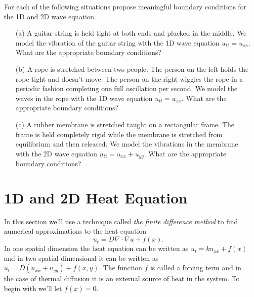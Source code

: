 \begin{problem}\label{prob:wave_bc}
   For each of the following situations propose meaningful boundary conditions for the 1D
   and 2D wave equation.
   \begin{enumerate}
       \item[(a)] A guitar string is held tight at both ends and plucked in the middle.
           We model the vibration of the guitar string with the 1D wave equation $u_{tt} =
           u_{xx}$.  What are the appropriate boundary conditions?
       \item[(b)] A rope is stretched between two people.  The person on the left holds
           the rope tight and doesn't move.  The person on the right wiggles the rope in a
           periodic fashion completing one full oscillation per second.  We model the
           waves in the rope with the 1D wave equation $u_{tt} = u_{xx}$.  What are the
           appropriate boundary conditions?
       \item[(c)] A rubber membrane is stretched taught on a rectangular frame.  The frame is
           held completely rigid while the membrane is stretched from equilibrium and then
           released.  We model the vibrations in the membrane with the 2D wave equation
           $u_{tt} = u_{xx} + u_{yy}$.  What are the appropriate boundary conditions?
   \end{enumerate}
\end{problem}


\newpage\section{1D and 2D Heat Equation}
In this section we'll use a technique called {\it the finite difference method} to find
numerical approximations to the heat equation
\[ u_t = D \nabla \cdot \nabla u + f(x). \]
In one spatial dimension the heat equation can be written as $u_t = ku_{xx} + f(x)$ and in
two spatial dimensional it can be written as $u_t = D \left( u_{xx} + u_{yy} \right) +
f(x,y)$.  The function $f$ is called a forcing term and in the case of thermal diffusion
it is an external source of heat in the system.  To begin with we'll let $f(x) = 0$.

